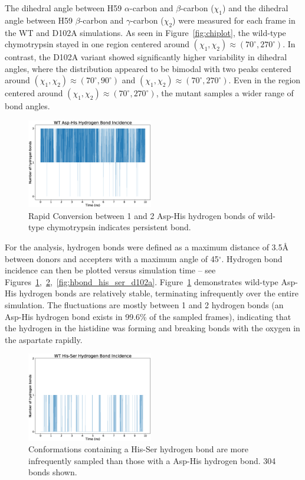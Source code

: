 \documentclass[11pt, twocolumn]{article}
\begin{document}
The dihedral angle between H59 \(\alpha\)-carbon and \(\beta\)-carbon
(\(\chi_1\)) and the dihedral angle between H59 \(\beta\)-carbon and
\(\gamma\)-carbon (\(\chi_2\)) were measured for each frame in the WT and
D102A simulations. As seen in Figure~\ref{fig:chiplot}, the wild-type
chymotrypsin stayed in one region centered around
\((\chi_1, \chi_2) \approx (70^\circ, 270^\circ)\).
In contrast, the D102A variant showed significantly higher variability
in dihedral angles, where the distribution appeared to be bimodal with
two peaks centered around \((\chi_1, \chi_2) \approx (70^\circ, 90^\circ)\)
and \((\chi_1, \chi_2) \approx (70^\circ, 270^\circ)\). Even in the region
centered around \((\chi_1, \chi_2) \approx (70^\circ, 270^\circ)\), the
mutant samples a wider range of bond angles.


\begin{figure}[H]
    \centering
        \includegraphics[width=0.49\textwidth]{wt_hbonds_asp_his.eps}
    \caption{Rapid Conversion between 1 and 2 Asp-His hydrogen bonds
        of wild-type chymotrypsin indicates persistent
        bond.}\label{fig:hbond_asp_his}
\end{figure}

For the analysis, hydrogen bonds were defined as a maximum distance of 3.5\AA{}
between donors and accepters with a maximum angle of 45\(^\circ\). Hydrogen
bond incidence can then be plotted versus simulation time -- see
Figures~\ref{fig:hbond_asp_his},~\ref{fig:hbond_his_ser_wt},~\ref{fig:hbond_his_ser_d102a}.
Figure~\ref{fig:hbond_asp_his} demonstrates wild-type Asp-His hydrogen bonds
are relatively stable, terminating infrequently over the entire simulation.
The fluctuations are mostly between 1 and 2 hydrogen bonds (an Asp-His hydrogen
bond exists in 99.6\% of the sampled frames), indicating that the hydrogen
in the histidine was forming and breaking bonds with the oxygen in the
aspartate rapidly.


\begin{figure}[H]
    \centering
        \includegraphics[width=0.49\textwidth]{wt_hbonds_his_ser.eps}
    \caption{Conformations containing a His-Ser hydrogen bond are
        more infrequently sampled than those with a Asp-His
        hydrogen bond. 304 bonds shown.
        }\label{fig:hbond_his_ser_wt}
\end{figure}
\end{document}
